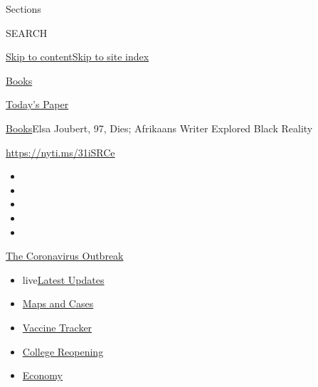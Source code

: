 Sections

SEARCH

\protect\hyperlink{site-content}{Skip to
content}\protect\hyperlink{site-index}{Skip to site index}

\href{https://www.nytimes3xbfgragh.onion/section/books}{Books}

\href{https://myaccount.nytimes3xbfgragh.onion/auth/login?response_type=cookie\&client_id=vi}{}

\href{https://www.nytimes3xbfgragh.onion/section/todayspaper}{Today's
Paper}

\href{/section/books}{Books}\textbar{}Elsa Joubert, 97, Dies; Afrikaans
Writer Explored Black Reality

\url{https://nyti.ms/31iSRCe}

\begin{itemize}
\item
\item
\item
\item
\item
\end{itemize}

\href{https://www.nytimes3xbfgragh.onion/news-event/coronavirus?action=click\&pgtype=Article\&state=default\&region=TOP_BANNER\&context=storylines_menu}{The
Coronavirus Outbreak}

\begin{itemize}
\tightlist
\item
  live\href{https://www.nytimes3xbfgragh.onion/2020/08/04/world/coronavirus-covid-19.html?action=click\&pgtype=Article\&state=default\&region=TOP_BANNER\&context=storylines_menu}{Latest
  Updates}
\item
  \href{https://www.nytimes3xbfgragh.onion/interactive/2020/us/coronavirus-us-cases.html?action=click\&pgtype=Article\&state=default\&region=TOP_BANNER\&context=storylines_menu}{Maps
  and Cases}
\item
  \href{https://www.nytimes3xbfgragh.onion/interactive/2020/science/coronavirus-vaccine-tracker.html?action=click\&pgtype=Article\&state=default\&region=TOP_BANNER\&context=storylines_menu}{Vaccine
  Tracker}
\item
  \href{https://www.nytimes3xbfgragh.onion/2020/08/02/us/covid-college-reopening.html?action=click\&pgtype=Article\&state=default\&region=TOP_BANNER\&context=storylines_menu}{College
  Reopening}
\item
  \href{https://www.nytimes3xbfgragh.onion/live/2020/08/03/business/stock-market-today-coronavirus?action=click\&pgtype=Article\&state=default\&region=TOP_BANNER\&context=storylines_menu}{Economy}
\end{itemize}

